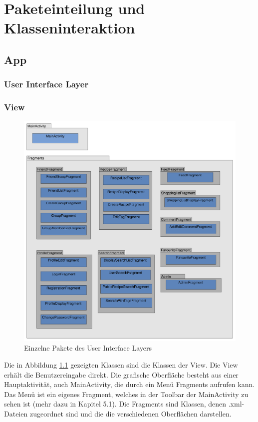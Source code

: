 \chapter{Paketeinteilung und Klasseninteraktion}

\section{App}

\subsection{User Interface Layer} 

\subsection{View}

\begin{figure}[H]
	\centering
	\includegraphics[width=1\textwidth]{pics/viewPackages/ViewPaketmodel.pdf}%
	\caption{Einzelne Pakete des User Interface Layers}%
	\label{view}%
\end{figure}

Die in Abbildung \ref{view} gezeigten Klassen sind die Klassen der View.
Die View erhält die Benutzereingabe direkt. Die grafische Oberfläche besteht aus einer Hauptaktivität, auch MainActivity, die durch ein Menü Fragments aufrufen kann. Das Menü ist ein eigenes Fragment, welches in der Toolbar der MainActivity zu sehen ist (mehr dazu in Kapitel 5.1). Die Fragments sind Klassen, denen .xml-Dateien zugeordnet sind und die die verschiedenen Oberflächen darstellen.

